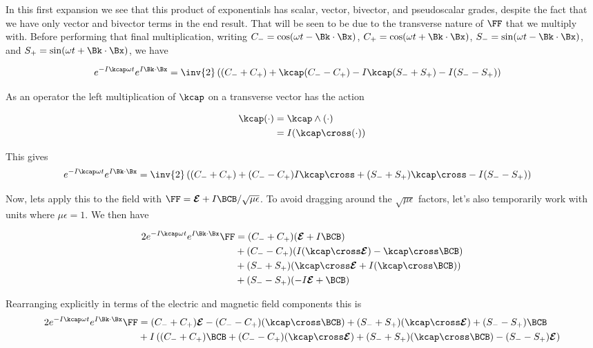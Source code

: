 In this first expansion we see that this product of exponentials has scalar, vector, bivector, and pseudoscalar grades, despite the fact that we have only
vector and bivector terms in the end result.  That will be seen to be due to the transverse nature of $\FF$ that we multiply with.  Before performing that final multiplication, writing $C_{-} = \cos(\omega t - \Bk \cdot \Bx)$, $C_{+} = \cos(\omega t + \Bk \cdot \Bx)$, $S_{-} = \sin(\omega t - \Bk \cdot \Bx)$, and $S_{+} = \sin(\omega t + \Bk \cdot \Bx)$, we have 

\begin{align}\label{eqn:fooH}
e^{ -I \kcap \omega t } e^{ I \Bk \cdot \Bx }
&=
\inv{2}
\left( 
(C_{-} + C_{+})
+\kcap (C_{-} - C_{+})
-I \kcap (S_{-} + S_{+})
-I (S_{-} - S_{+})
\right)
\end{align}

As an operator the left multiplication of $\kcap$ on a transverse vector has the action

\begin{align*}
\kcap ( \cdot ) 
&= \kcap \wedge (\cdot) \\
&= I (\kcap \cross (\cdot)) \\
\end{align*}

This gives
\begin{align}\label{eqn:fooI}
e^{ -I \kcap \omega t } e^{ I \Bk \cdot \Bx }
&=
\inv{2}
\left( 
(C_{-} + C_{+})
+(C_{-} - C_{+}) I \kcap \cross
+(S_{-} + S_{+}) \kcap \cross
-I (S_{-} - S_{+})
\right)
\end{align}

Now, lets apply this to the field with $\FF = \EE + I\BCB/\sqrt{\mu\epsilon}$.  To avoid dragging around the $\sqrt{\mu\epsilon}$ factors, let's also temporarily
work with units where $\mu\epsilon = 1$.  We then have

\begin{align*}
2 e^{ -I \kcap \omega t } e^{ I \Bk \cdot \Bx } \FF
&= (C_{-} + C_{+}) (\EE + I\BCB) \\
&+ (C_{-} - C_{+}) (I (\kcap \cross \EE) - \kcap \cross \BCB) \\
&+ (S_{-} + S_{+}) (\kcap \cross \EE +I (\kcap \cross \BCB))  \\
&+ (S_{-} - S_{+}) (-I \EE + \BCB) 
\end{align*}

Rearranging explicitly in terms of the electric and magnetic field components this is
\begin{align*}
2 e^{ -I \kcap \omega t } e^{ I \Bk \cdot \Bx } \FF
&=
 (C_{-} + C_{+}) \EE 
-(C_{-} - C_{+}) (\kcap \cross \BCB)
+(S_{-} + S_{+}) (\kcap \cross \EE)
+(S_{-} - S_{+}) \BCB \\
&+{I}
\left( 
 (C_{-} + C_{+}) \BCB
+(C_{-} - C_{+}) (\kcap \cross \EE)
+(S_{-} + S_{+}) (\kcap \cross \BCB)
-(S_{-} - S_{+}) \EE 
\right) \\
\end{align*}


